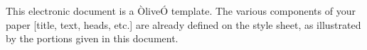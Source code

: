 This electronic document is a ÒliveÓ template. The various components of your paper [title, text, heads, etc.] are already defined on the style sheet, as illustrated by the portions given in this document.